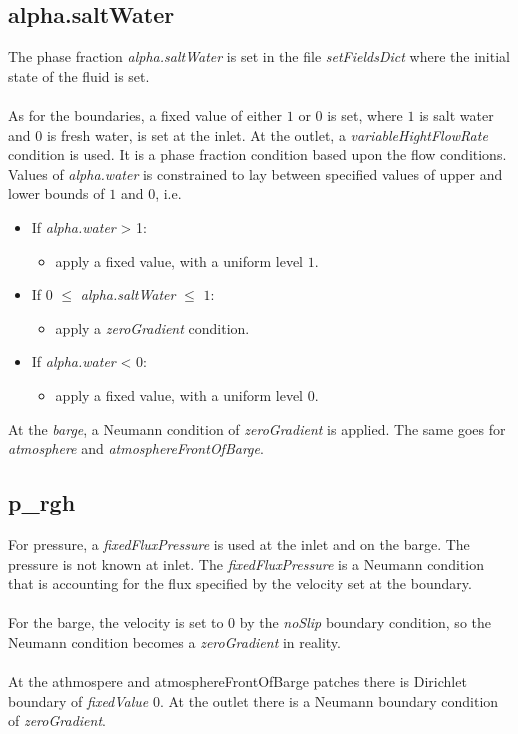 \documentclass[a4paper, 12pt]{report}
\begin{document}
\subsection{alpha.saltWater}
The phase fraction \textit{alpha.saltWater} is set in the file \textit{setFieldsDict} where the initial state of the fluid is set.\\
\\
As for the boundaries, a fixed value of either $1$ or $0$ is set, where $1$ is salt water and $0$ is fresh water, is set at the inlet. At the outlet, a \textit{variableHightFlowRate} condition is used. It is a phase fraction condition based upon the flow conditions. Values of \textit{alpha.water} is constrained to lay between specified values of upper and lower bounds of $1$ and $0$, i.e.
\begin{itemize}
\item If \textit{alpha.water} > 1:
	\begin{itemize}
	\item apply a fixed value, with a uniform level $1$.
\end{itemize}
\item If $0$ $\leq$ \textit{alpha.saltWater} $\leq$ $1$:
	\begin{itemize}
	\item apply a \textit{zeroGradient} condition.
	\end{itemize}
\item If \textit{alpha.water} < 0:
	\begin{itemize}
	\item apply a fixed value, with a uniform level $0$.
\end{itemize}
\end{itemize}
At the \textit{barge}, a Neumann condition of \textit{zeroGradient} is applied. The same goes for \textit{atmosphere} and \textit{atmosphereFrontOfBarge}.
\subsection{p\_rgh}
For pressure, a \textit{fixedFluxPressure} is used at the inlet and on the barge. The pressure is not known at inlet. The \textit{fixedFluxPressure} is a Neumann condition that is accounting for the flux specified by the velocity set at the boundary.\\
\\
For the barge, the velocity is set to 0 by the \textit{noSlip} boundary condition, so the Neumann  condition becomes a \textit{zeroGradient} in reality.\\
\\
At the athmospere and atmosphereFrontOfBarge patches there is Dirichlet boundary of \textit{fixedValue} 0. At the outlet there is a Neumann boundary condition of \textit{zeroGradient}. 
\end{document}
